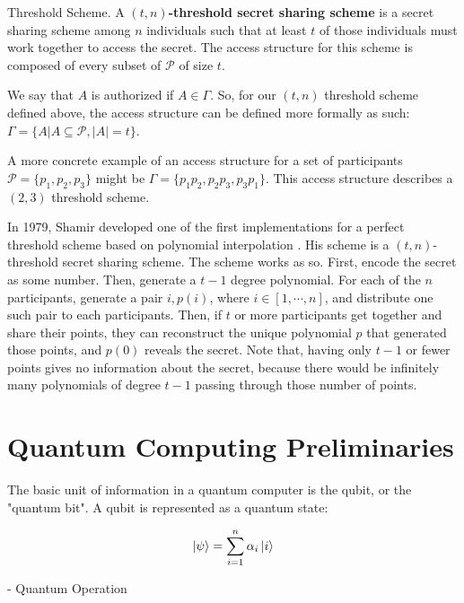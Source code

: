 \theoremstyle{definition}
\begin{definition}{Threshold Scheme.}
    A \textbf{$(t,n)$-threshold secret sharing scheme} is a secret sharing scheme among $n$ individuals such that at least $t$ of those individuals must work together to access the secret. The access structure for this scheme is composed of every subset of $\mathcal{P}$ of size $t$.
\end{definition}

We say that $A$ is authorized if $A \in \Gamma$. So, for our $(t,n)$ threshold scheme defined above, the access structure can be defined more formally as such: $\Gamma = \{A | A \subseteq \mathcal{P} , |A| = t\}$.

A more concrete example of an access structure for a set of participants $\mathcal{P} = \{p_1,p_2,p_3\}$ might be $\Gamma = \{p_1p_2,p_2p_3,p_3p_1\}$. This access structure describes a $(2,3)$ threshold scheme.

In 1979, Shamir developed one of the first implementations for a perfect threshold scheme based on polynomial interpolation \cite{shamir-whisper}. His scheme is a $(t,n)$-threshold secret sharing scheme. The scheme works as so. First, encode the secret as some number. Then, generate a $t-1$ degree polynomial. For each of the $n$ participants, generate a pair $i, p(i)$, where $i \in [1, \cdots, n]$, and distribute one such pair to each participants. Then, if $t$ or more participants get together and share their points, they can reconstruct the unique polynomial $p$ that generated those points, and $p(0)$ reveals the secret. Note that, having only $t-1$ or fewer points gives no information about the secret, because there would be infinitely many polynomials of degree $t-1$ passing through those number of points.



\section{Quantum Computing Preliminaries}

The basic unit of information in a quantum computer is the qubit, or the "quantum bit". A qubit is represented as a quantum state:

\begin{align*}
    \ket{\psi} &= \sum_{i=1}^n \alpha_i\ket{i} \\ 
\end{align*}

- Quantum Operation

